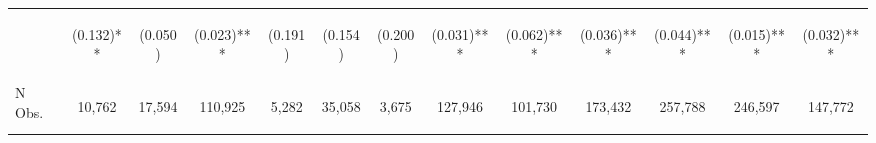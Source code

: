 \begin{center}
\begin{tabular}{lcccccccccccc}
 & \begin{normalsize}(0.132)**\end{normalsize} & \begin{normalsize}(0.050)\end{normalsize} & \begin{normalsize}(0.023)***\end{normalsize} & \begin{normalsize}(0.191)\end{normalsize} & \begin{normalsize}(0.154)\end{normalsize} & \begin{normalsize}(0.200)\end{normalsize} & \begin{normalsize}(0.031)***\end{normalsize} & \begin{normalsize}(0.062)***\end{normalsize} & \begin{normalsize}(0.036)***\end{normalsize} & \begin{normalsize}(0.044)***\end{normalsize} & \begin{normalsize}(0.015)***\end{normalsize} & \begin{normalsize}(0.032)***\end{normalsize}\\
\noalign{\smallskip}\hline N Obs. & \begin{normalsize}10,762\end{normalsize} & \begin{normalsize}17,594\end{normalsize} & \begin{normalsize}110,925\end{normalsize} & \begin{normalsize}5,282\end{normalsize} & \begin{normalsize}35,058\end{normalsize} & \begin{normalsize}3,675\end{normalsize} & \begin{normalsize}127,946\end{normalsize} & \begin{normalsize}101,730\end{normalsize} & \begin{normalsize}173,432\end{normalsize} & \begin{normalsize}257,788\end{normalsize} & \begin{normalsize}246,597\end{normalsize} & \begin{normalsize}147,772\end{normalsize}\\

\end{tabular}
\end{center}
